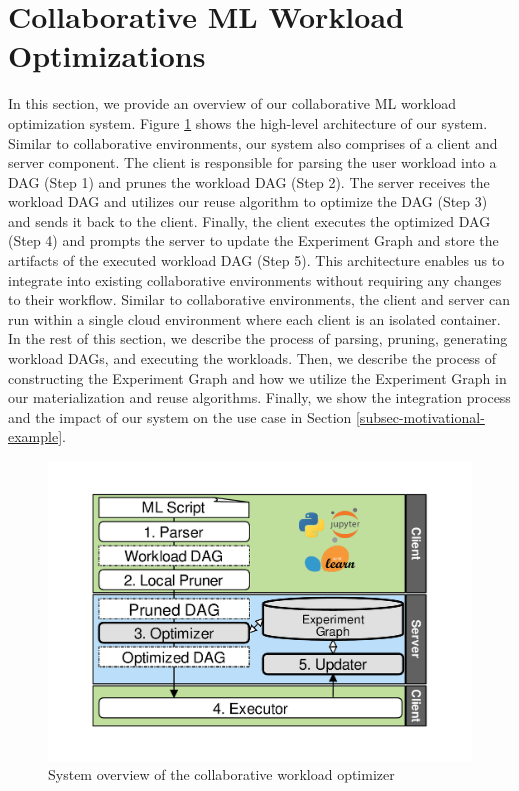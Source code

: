 \section{Collaborative ML Workload Optimizations} \label{sec-ml-workloads}
In this section, we provide an overview of our collaborative ML workload optimization system.
Figure \ref{system-workflow} shows the high-level architecture of our system.
Similar to collaborative environments, our system also comprises of a client and server component.
The client is responsible for parsing the user workload into a DAG (Step 1) and prunes the workload DAG (Step 2).
The server receives the workload DAG and utilizes our reuse algorithm to optimize the DAG (Step 3) and sends it back to the client.
Finally, the client executes the optimized DAG (Step 4) and prompts the server to update the Experiment Graph and store the artifacts of the executed workload DAG (Step 5).
This architecture enables us to integrate into existing collaborative environments without requiring any changes to their workflow.
Similar to collaborative environments, the client and server can run within a single cloud environment where each client is an isolated container.
In the rest of this section, we describe the process of parsing, pruning, generating workload DAGs, and executing the workloads.
Then, we describe the process of constructing the Experiment Graph and how we utilize the Experiment Graph in our materialization and reuse algorithms. 
Finally, we show the integration process and the impact of our system on the use case in Section \ref{subsec-motivational-example}.

\begin{figure}
\centering
\includegraphics[width=0.9\columnwidth]{../images/system-workflow}
\caption{System overview of the collaborative workload optimizer}
\label{system-workflow}
\end{figure}

